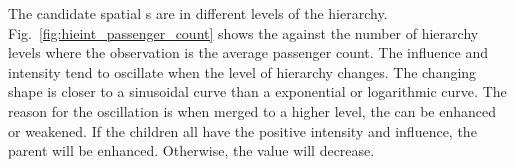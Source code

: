 The candidate spatial {\explanation}s are in different levels of the hierarchy. 
Fig.~\ref{fig:hieint_passenger_count} shows the {\influence} against the number of hierarchy levels where the observation is the average passenger count. 
The influence and intensity tend to oscillate when the level of hierarchy changes.
The changing shape is closer to a sinusoidal curve than a exponential or logarithmic curve. 
The reason for the oscillation is when merged to a higher level, the {\explanation} can be enhanced or weakened. 
If the children {\explanation} all have the positive intensity and influence, the parent {\explanation} will be enhanced. 
Otherwise, the value will decrease. 



